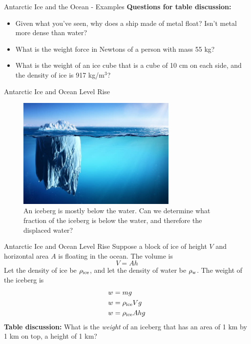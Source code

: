 \documentclass{beamer}
\begin{document}
\begin{frame}{Antarctic Ice and the Ocean - Examples}
\textbf{Questions for table discussion:}
\begin{itemize}
\item Given what you've seen, why does a ship made of metal float?  Isn't metal more dense than water?
\item What is the weight force in Newtons of a person with mass 55 kg?
\item What is the weight of an ice cube that is a cube of 10 cm on each side, and the density of ice is 917 kg/m$^3$?
\end{itemize}
\end{frame}

\begin{frame}{Antarctic Ice and Ocean Level Rise}
\begin{figure}
\centering
\includegraphics[width=0.7\textwidth]{ice.jpg}
\caption{\label{fig:ice} An iceberg is mostly below the water.  Can we determine what fraction of the iceberg is below the water, and therefore the displaced water?}
\end{figure}
\end{frame}

\begin{frame}{Antarctic Ice and Ocean Level Rise}
Suppose a block of ice of height $V$ and horizontal area $A$ is floating in the ocean.  The volume is
\begin{equation}
V = Ah
\end{equation}
Let the density of ice be $\rho_{\rm ice}$, and let the density of water be $\rho_{\rm w}$.  The weight of the iceberg is
\begin{align}
w &= mg \\
w &= \rho_{\rm ice} V g \\
w &= \rho_{\rm ice} A h g
\end{align}
\textbf{Table discussion:} What is the \textit{weight} of an iceberg that has an area of 1 km by 1 km on top, a height of 1 km?
\end{frame}
\end{document}
